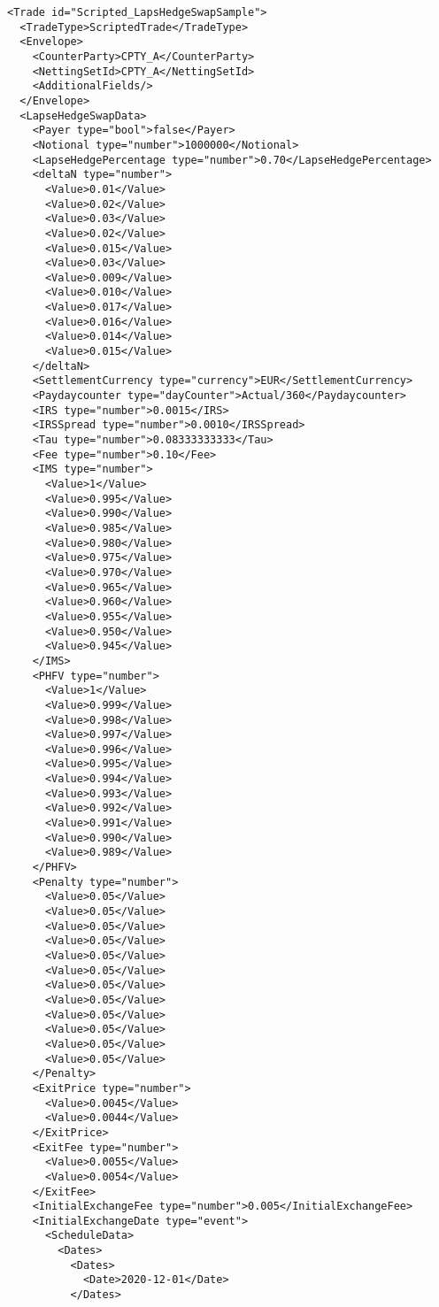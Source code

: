 \begin{verbatim} 
<Trade id="Scripted_LapsHedgeSwapSample">
  <TradeType>ScriptedTrade</TradeType>
  <Envelope>
    <CounterParty>CPTY_A</CounterParty>
    <NettingSetId>CPTY_A</NettingSetId>
    <AdditionalFields/>
  </Envelope>
  <LapseHedgeSwapData>
    <Payer type="bool">false</Payer>
    <Notional type="number">1000000</Notional>
    <LapseHedgePercentage type="number">0.70</LapseHedgePercentage>
    <deltaN type="number">
      <Value>0.01</Value>
      <Value>0.02</Value>
      <Value>0.03</Value>
      <Value>0.02</Value>
      <Value>0.015</Value>
      <Value>0.03</Value>
      <Value>0.009</Value>
      <Value>0.010</Value>
      <Value>0.017</Value>
      <Value>0.016</Value>
      <Value>0.014</Value>
      <Value>0.015</Value>
    </deltaN>
    <SettlementCurrency type="currency">EUR</SettlementCurrency>
    <Paydaycounter type="dayCounter">Actual/360</Paydaycounter>
    <IRS type="number">0.0015</IRS>
    <IRSSpread type="number">0.0010</IRSSpread>
    <Tau type="number">0.08333333333</Tau>
    <Fee type="number">0.10</Fee>
    <IMS type="number">
      <Value>1</Value>
      <Value>0.995</Value>
      <Value>0.990</Value>
      <Value>0.985</Value>
      <Value>0.980</Value>
      <Value>0.975</Value>
      <Value>0.970</Value>
      <Value>0.965</Value>
      <Value>0.960</Value>
      <Value>0.955</Value>
      <Value>0.950</Value>
      <Value>0.945</Value>
    </IMS>
    <PHFV type="number">
      <Value>1</Value>
      <Value>0.999</Value>
      <Value>0.998</Value>
      <Value>0.997</Value>
      <Value>0.996</Value>
      <Value>0.995</Value>
      <Value>0.994</Value>
      <Value>0.993</Value>
      <Value>0.992</Value>
      <Value>0.991</Value>
      <Value>0.990</Value>
      <Value>0.989</Value>
    </PHFV>
    <Penalty type="number">
      <Value>0.05</Value>
      <Value>0.05</Value>
      <Value>0.05</Value>
      <Value>0.05</Value>
      <Value>0.05</Value>
      <Value>0.05</Value>
      <Value>0.05</Value>
      <Value>0.05</Value>
      <Value>0.05</Value>
      <Value>0.05</Value>
      <Value>0.05</Value>
      <Value>0.05</Value>
    </Penalty>
    <ExitPrice type="number">
      <Value>0.0045</Value>
      <Value>0.0044</Value>
    </ExitPrice>
    <ExitFee type="number">
      <Value>0.0055</Value>
      <Value>0.0054</Value>
    </ExitFee>
    <InitialExchangeFee type="number">0.005</InitialExchangeFee>
    <InitialExchangeDate type="event">
      <ScheduleData>
        <Dates>
          <Dates>
            <Date>2020-12-01</Date>
          </Dates>

\end{verbatim}
